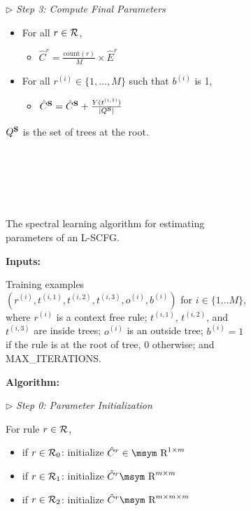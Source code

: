 \documentclass[11pt]{article}
\newcommand{\rione}{r^{(i)}}
\newcommand{\xione}{t^{(i,1)}}
\newcommand{\xitwo}{t^{(i,2)}}
\newcommand{\xithree}{t^{(i,3)}}
\newcommand{\oi}{o^{(i)}}
\newcommand{\rules}{{\cal R}}
\newcommand{\srule}{{X \rightarrow b, c}}
\newcommand{\e}[1]{\hat{#1}}
\newcommand{\bS}{{\bf S}}
\newcommand{\reals}{\mbox{\msym R}}
\begin{document}
\begin{figure*}[t!]
{\begin{footnotesize}
\begin{subfigure}{0.87\columnwidth}
	$\triangleright$ \emph{Step 3: Compute Final Parameters}
	\begin{itemize}
		\item For all $r \in \rules$, 
			\begin{itemize}[label={}]
				\item $\e{C}^r = \frac{\textrm{count}(r)}{M} \times \e{E}^r$
			\end{itemize}
		\item For all $\rione \in \{1, \dots, M\}$ such that $b^{(i)}$ is 1, 
		\begin{itemize}[label={}]
			\item $\e{C}^\bS =  \e{C}^\bS + \frac{Y(\xione)}{|Q^\bS|} $
		\end{itemize}						
	\end{itemize}
	$Q^\bS$ is the set of trees at the root.  

$\,$

$\,$

$\,$

$\,$

$\,$

$\,$

$\,$

	\caption{\small The spectral learning algorithm for estimating parameters of an L-SCFG.}
	\label{fig:splearn}
	\end{subfigure}
	\begin{subfigure}{1.05\columnwidth}
	{\bf Inputs:} 
	
	Training examples $(\rione, \xione, \xitwo, \xithree, \oi, b^{(i)})$ for $i \in \{1 \ldots M\}$, where $\rione$ is a context free rule; $\xione$, $\xitwo$, and $\xithree$ are inside trees; $\oi$ is an outside tree; $b^{(i)} = 1$ if the rule is at the root of tree, $0$ otherwise; and MAX\_ITERATIONS.

	{\bf Algorithm:}

	$\triangleright$ \emph{Step 0: Parameter Initialization}
	
	For rule $r \in \rules$,
	\begin{itemize}[noitemsep]
		\item if $r \in \rules_0$: initialize $\e{C}^r \in \reals^{1 \times m}$ 
		\item if $r \in \rules_1$: initialize $\e{C}^r \reals^{m \times m}$ 
		\item if $r \in \rules_2$: initialize $\e{C}^r \reals^{m \times m \times m}$ 
	\end{itemize}
	

\end{subfigure}
\end{footnotesize}}
\end{figure*}
\end{document}

